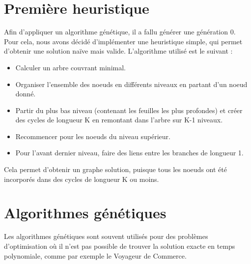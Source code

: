 \documentclass[frenchb]{article}
\begin{document}
			\section{Première heuristique}
                            Afin d'appliquer un algorithme génétique, il a fallu générer une génération 0. Pour cela, nous avons décidé d'implémenter une heuristique simple, qui permet d'obtenir une solution naïve mais valide. L'algorithme utilisé est le suivant : \begin{itemize}
                        \item Calculer un arbre couvrant minimal.
                        \item Organiser l'ensemble des noeuds en différents niveaux en partant d'un noeud donné.
                        \item Partir du plus bas niveau (contenant les feuilles les plus profondes) et créer des cycles de longueur K en remontant dans l'arbre sur K-1 niveaux.
                        \item Recommencer pour les noeuds du niveau supérieur.
                        \item Pour l'avant dernier niveau, faire des liens entre les branches de longueur 1.
                        \end{itemize}
                        Cela permet d'obtenir un graphe solution, puisque tous les noeuds ont été incorporés dans des cycles de longueur K ou moins.
                        \section{Algorithmes génétiques}
                        Les algorithmes génétiques sont souvent utilisés pour des problèmes d'optimisation où il n'est pas possible de trouver la solution exacte en temps polynomiale, comme par exemple le Voyageur de Commerce. \\
\end{document}
